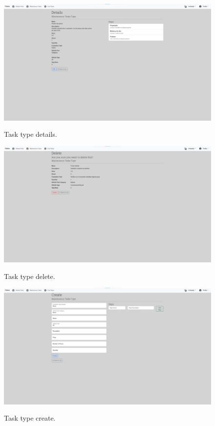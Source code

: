 \begin{figure}[htbp]
  \caption{Task type details.}
  \centering
  \includegraphics[width=\textwidth]{figs/Implementation/dealershipAdmin/taskDetails}
  \label{fig:taskDetails}
\end{figure}

 
\begin{figure}[htbp]
  \caption{Task type delete.}
  \centering
  \includegraphics[width=\textwidth]{figs/Implementation/dealershipAdmin/taskDelete}
  \label{fig:taskDelete}
\end{figure}

\begin{figure}[htbp]
  \caption{Task type create.}
  \centering
  \includegraphics[width=\textwidth]{figs/Implementation/dealershipAdmin/taskCreate}
  \label{fig:taskCreate}
\end{figure}


